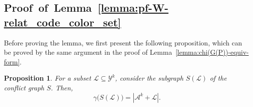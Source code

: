 \documentclass[11pt,draftclsnofoot,onecolumn]{IEEEtran}
\newtheorem{prop}{Proposition}
\begin{document}
\begin{journalonly}

\section{Proof~of~Lemma~\ref{lemma:pf-W-relat_code_color_set}}\label{appendix-pf-lem-W-relate_code_color-set}

{\color{blue}
Before proving the lemma, we first present the following proposition, which can be proved
by the same argument in the proof of Lemma~\ref{lemma:chi(G(P))-equiv-form}.
\begin{prop}
For a subset $\mathcal{L}\subseteq\mathcal{Y}^k$, consider  the  subgraph $S(\mathcal{L})$  of the conflict graph $S$. Then,
\begin{equation}
\gamma\big(S(\mathcal{L})\big)=|\mathcal{A}^k+\mathcal{L}|.\label{eq:gamma(S(P))-low-bound}
\end{equation}
\end{prop}

}
\end{journalonly}
\end{document}
